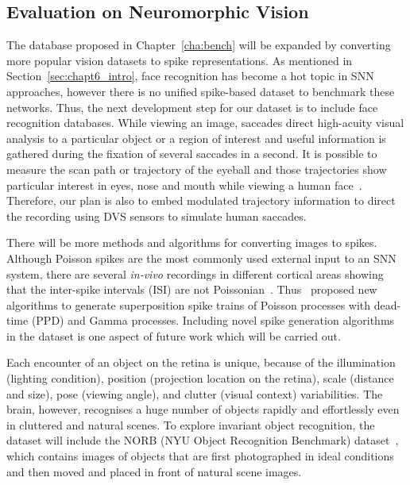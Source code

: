 \subsection{Evaluation on Neuromorphic Vision}
The database proposed in Chapter~\ref{cha:bench} will be expanded by converting more popular vision datasets to spike representations.
As mentioned in Section~\ref{sec:chapt6_intro}, face recognition has become a hot topic in SNN approaches, however there is no unified spike-based dataset to benchmark these networks.
Thus, the next development step for our dataset is to include face recognition databases.
While viewing an image, saccades direct high-acuity visual analysis to a particular object or a region of interest and useful information is gathered during the fixation of several saccades in a second.
It is possible to measure the scan path or trajectory of the eyeball and those trajectories show particular interest in eyes, nose and mouth while viewing a human face~\citep{yarbus1967eye}.
Therefore, our plan is also to embed modulated trajectory information to direct the recording using DVS sensors to simulate human saccades.

There will be more methods and algorithms for converting images to spikes.
Although Poisson spikes are the most commonly used external input to an SNN system, there are several \textit{in-vivo} recordings in different cortical areas showing that the inter-spike intervals (ISI) are not Poissonian~\DIFdelbegin {}\DIFdelend \DIFaddbegin {}\DIFaddend . 
Thus~\citep{deger2012statistical} proposed new algorithms to generate superposition spike trains of Poisson processes with dead-time (PPD) and \DIFdelbegin {}\DIFdelend Gamma processes.
Including novel spike generation algorithms in the dataset is one aspect of future work which will be carried out.

Each encounter of an object on the retina is unique, because of the illumination (lighting condition), position (projection location on the retina), scale (distance and size), pose (viewing angle), and clutter (visual context) variabilities.
The brain, however, recognises a huge number of objects rapidly and effortlessly even in cluttered and natural scenes.
To explore invariant object recognition, the dataset will include the NORB (NYU Object Recognition Benchmark) dataset~\citep{lecun2004learning}, which contains images of objects that are first photographed in ideal conditions and then moved and placed in front of natural scene images.

